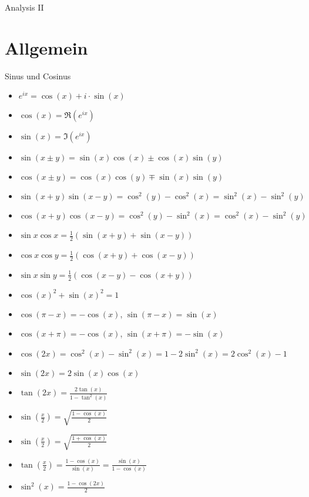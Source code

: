 \begin{center}\begin{Huge}Analysis II\end{Huge}\end{center}

\section{Allgemein}



\begin{Rechenregeln}{Sinus und Cosinus}{}
    \begin{itemize}
    \item $e^{ix} = \cos(x) + i\cdot \sin(x)$
    \item $\cos(x) = \Re(e^{ix})$
    \item $\sin(x) = \Im(e^{ix})$
    \item $\sin(x\pm y) = \sin(x)\cos(x) \pm \cos(x)\sin(y)$ 
    \item $\cos(x\pm y) = \cos(x)\cos(y) \mp \sin(x)\sin(y)$
    \item $\sin(x+y)\sin(x-y) = \cos^2(y) - \cos^2(x) = \sin^2(x) - \sin^2(y)$
    \item $\cos(x+y)\cos(x-y) = \cos^2(y) - \sin^2(x) = \cos^2(x) - \sin^2(y)$
    \item $\sin{x}\cos{x} = \frac{1}{2}(\sin(x+y) + \sin(x-y))$ 
    \item $\cos{x}\cos{y} = \frac{1}{2}(\cos(x+y) + \cos(x-y))$
    \item  $\sin{x}\sin{y} = \frac{1}{2}(\cos(x-y)-\cos(x+y))$
    \item $\cos(x)^2 + \sin(x)^2 = 1$
    \item $\cos(\pi-x) = -\cos(x)$, $\sin(\pi-x) = \sin(x)$
    \item $\cos(x+\pi) = -\cos(x)$, $\sin(x+\pi) = -\sin(x)$
    \item $\cos(2x) = \cos^2(x) - \sin^2(x) = 1-2\sin^2(x) = 2\cos^2(x) - 1$
    \item $\sin(2x) = 2\sin(x)\cos(x)$
    \item $\tan(2x) = \frac{2\tan(x)}{1-\tan^2(x)}$
    \item $\sin(\frac{x}{2}) = \sqrt{\frac{1-\cos(x)}{2}}$
    \item $\sin(\frac{x}{2}) = \sqrt{\frac{1+\cos(x)}{2}}$
    \item $\tan(\frac{x}{2}) = \frac{1-\cos(x)}{\sin(x)} = \frac{\sin(x)}{1-\cos(x)}$
    \item $\sin^2(x) = \frac{1-\cos(2x)}{2}$

\end{itemize}
\end{Rechenregeln}
